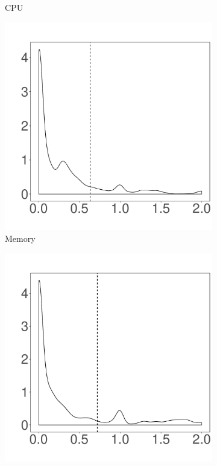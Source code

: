 \documentclass[10pt,journal,compsoc]{IEEEtran}
\begin{document}
\begin{figure}
\begin{subfigure}{0.19\textwidth}
                \caption{CPU}
        \end{subfigure}%
        \begin{subfigure}{0.19\textwidth}
                \includegraphics[width=\linewidth]{Figures/mem-hadoop-cluster.pdf}
                \caption{Memory}
        \end{subfigure}%
        \begin{subfigure}{0.19\textwidth}
                \includegraphics[width=\linewidth]{Figures/ioread-hadoop-cluster.pdf}

\end{subfigure}
\end{figure}
\end{document}
